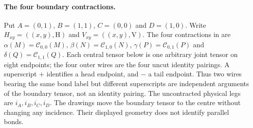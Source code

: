 \paragraph{The four boundary contractions.}
Put $A=(0,1)$, $B=(1,1)$, $C=(0,0)$ and $D=(1,0)$.
Write $H_{xy}=((x,y),\mathrm H)$ and $V_{xy}=((x,y),\mathrm V)$.
The four contractions in \cite[Theorem~5.5]{Schuch2010PEPS} are
$\alpha(M)=\mathcal C_{0,0}(M)$, $\beta(N)=\mathcal C_{1,0}(N)$,
$\gamma(P)=\mathcal C_{0,1}(P)$ and $\delta(Q)=\mathcal C_{1,1}(Q)$.
Each central tensor below is one arbitrary joint tensor on eight endpoints;
the four outer wires are the four uncut identity pairings.
A superscript $+$ identifies a head endpoint, and $-$ a tail endpoint.
Thus two wires bearing the same bond label but different superscripts are
independent arguments of the boundary tensor, not an identity pairing.
The uncontracted physical legs are $i_A,i_B,i_C,i_D$.
The drawings move the boundary tensor to the centre without changing any
incidence. Their displayed geometry does not identify parallel bonds.

